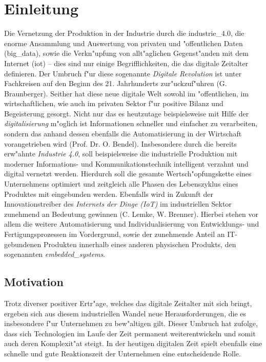 

\chapter{Einleitung}
\minitoc
\vspace{1 cm} 

Die Vernetzung der Produktion in der Industrie durch die \gls{industrie_4.0}, die enorme 
Ansammlung und Auswertung von privaten und "offentlichen Daten (\gls{big_data}), sowie die 
Verkn"upfung von allt"aglichen Gegenst"anden mit dem Internet (\gls{iot}) -- dies sind nur
einige Begrifflichkeiten, die das digitale Zeitalter definieren. Der Umbruch f"ur diese 
sogenannte \textit{Digitale Revolution} ist unter Fachkreisen auf den Beginn des 21. 
Jahrhunderts zur"uckzuf"uhren \cite{qeins} (G. Braunberger). Seither hat diese neue digitale 
Welt sowohl im "offentlichen, im wirtschaftlichen, wie auch im privaten Sektor f"ur positive Bilanz 
und Begeisterung gesorgt. Nicht nur das es heutzutage beispielsweise mit Hilfe der 
\textit{\gls{digitalisierung}} m"oglich ist Informationen schneller und einfacher zu verarbeiten, 
sondern das anhand dessen ebenfalls die Automatisierung in der Wirtschaft vorangetrieben 
wird \cite{qzwei} (Prof. Dr. O. Bendel). Insbesondere durch die bereits erw"ahnte \textit{Industrie 4.0}, soll beispielsweise die industrielle Produktion mit moderner Informations- und Kommunikationstechnik intelligent verzahnt und digital vernetzt werden. Hierdurch soll die gesamte Wertsch"opfungskette eines Unternehmens optimiert und zeitgleich alle Phasen des Lebenszyklus eines Produktes mit eingebunden werden. Ebenfalls wird in Zukunft der Innovationstreiber des \textit{Internets der Dinge (IoT)} im industriellen Sektor zunehmend an Bedeutung gewinnen \cite{qdrei} (C. Lemke, W. Brenner). Hierbei stehen vor allem die weitere Automatisierung und Individualisierung von Entwicklungs- und Fertigungsprozessen im Vordergrund, sowie der zunehmende Anteil an IT-gebundenen Produkten innerhalb eines anderen physischen Produkts, den sogenannten \textit{\gls{embedded_systems}}.


\section{Motivation}
Trotz diverser positiver Ertr"age, welches das digitale Zeitalter mit sich bringt, ergeben sich aus diesem industriellen Wandel neue Herausforderungen, die es insbesondere f"ur Unternehmen zu bew"altigen gilt. Dieser Umbruch hat zufolge, dass sich Technologien im Laufe der Zeit permanent weiterentwickeln und somit auch deren Komplexit"at steigt. In der heutigen digitalen Zeit spielt ebenfalls eine schnelle und gute Reaktionszeit der Unternehmen 
eine entscheidende Rolle. 

